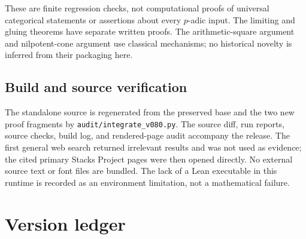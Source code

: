 \documentclass[11pt]{article}
\theoremstyle{definition}
\theoremstyle{remark}
\begin{document}
These are finite regression checks, not computational proofs of universal categorical statements or assertions about every $p$-adic input. The limiting and gluing theorems have separate written proofs. The arithmetic-square argument and nilpotent-cone argument use classical mechanisms; no historical novelty is inferred from their packaging here.

\subsection{Build and source verification}
The standalone source is regenerated from the preserved base and the two new proof fragments by \texttt{audit/integrate\_v080.py}. The source diff, run reports, source checks, build log, and rendered-page audit accompany the release. The first general web search returned irrelevant results and was not used as evidence; the cited primary Stacks Project pages were then opened directly. No external source text or font files are bundled. The lack of a Lean executable in this runtime is recorded as an environment limitation, not a mathematical failure.

\section{Version ledger}
\end{document}
